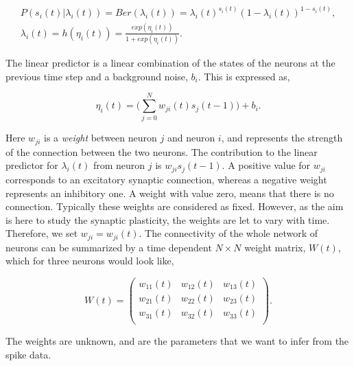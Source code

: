 \begin{equation}
\label{eq:prob}
\begin{split}
P(s_i(t)|\lambda_i(t)) =  Ber(\lambda_i(t)) = \lambda_i(t)^{s_i(t)}(1-\lambda_i(t))^{1-s_i(t)}, \\ \lambda_i(t) = h(\eta_i(t))= \frac{exp(\eta_i(t))}{1+exp(\eta_i(t))}.
\end{split}
\end{equation}

The linear predictor is a linear combination of the states of the neurons at the previous time step and a background noise, $b_i$. This is expressed as,

\begin{equation}
\label{eq:lin_pred}
    \eta_i(t) = \Big (\sum_{j=0}^{N}  w_{ji}(t)s_j(t-1) \Big) + b_i.
\end{equation}

Here $w_{ji}$ is a \textit{weight} between neuron $j$ and neuron $i$, and represents the strength of the connection between the two neurons. The contribution to the linear predictor for $\lambda_i(t)$ from neuron $j$ is $w_{ji}s_j(t-1)$. A positive value for $w_{ji}$ corresponds to an excitatory synaptic connection, whereas a negative weight represents an inhibitory one. A weight with value zero, means that there is no connection. Typically these weights are considered as fixed. However, as the aim is here to study the synaptic plasticity, the weights are let to vary with time. Therefore, we set $w_{ji} = w_{ji}(t)$. The connectivity of the whole network of neurons can be summarized by a time dependent $N \times N$ weight matrix, $W(t)$, which for three neurons would look like, 

\begin{equation*}
W(t) = 
\begin{pmatrix}
w_{11}(t) & w_{12}(t) & w_{13}(t)\\
w_{21}(t) & w_{22}(t) & w_{23}(t)\\
w_{31}(t) & w_{32}(t) & w_{33}(t)\\
\end{pmatrix}.
\end{equation*}

The weights are unknown, and are the parameters that we want to infer from the spike data. 




